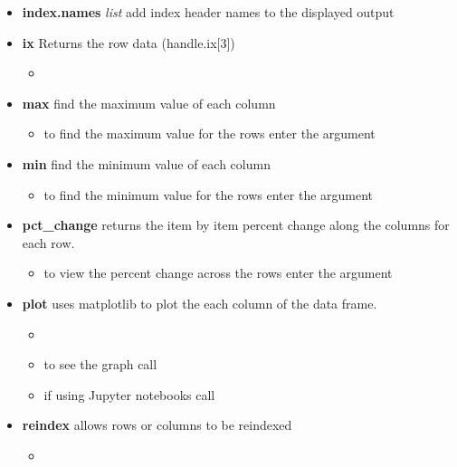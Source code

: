 \begin{itemize}
  \item \textbf{index.names} \textit{list} add index header names to the
    displayed output
  \item \textbf{ix} Returns the row data (handle.ix[3])
    \begin{itemize}
      \item \color{red}{if additional rows and columns are added using this
        command it will have the same effect as calling reindex.}
    \end{itemize}
  \item \textbf{max} find the maximum value of each column
    \begin{itemize}
      \item to find the maximum value for the rows enter the argument
        \color{red}{axis=1}
    \end{itemize}
  \item \textbf{min} find the minimum value of each column
    \begin{itemize}
      \item to find the minimum value for the rows enter the argument
        \color{red}{axis=1}
    \end{itemize}
  \item \textbf{pct\_change} returns the item by item percent change along the
    columns for each row.
    \begin{itemize}
      \item to view the percent change across the rows enter the argument
        \color{red}{axis=1}
    \end{itemize}
  \item \textbf{plot} uses matplotlib to plot the each column of the data frame.
    \begin{itemize}
      \item {\color{red}{make sure to import matplotlib before calling this
        method}}
      \item to see the graph call {\color{red}{plt.show()}}
      \item if using Jupyter notebooks call {\color{red}{\%matplotlib inline}}
    \end{itemize}
  \item \textbf{reindex} allows rows or columns to be reindexed
    \begin{itemize}
      \item \color{red}{if no arguments are passed the rows will be reindexed,
        and if the columns argument is passed the columns will be reindexed.}
    \end{itemize}

\end{itemize}
